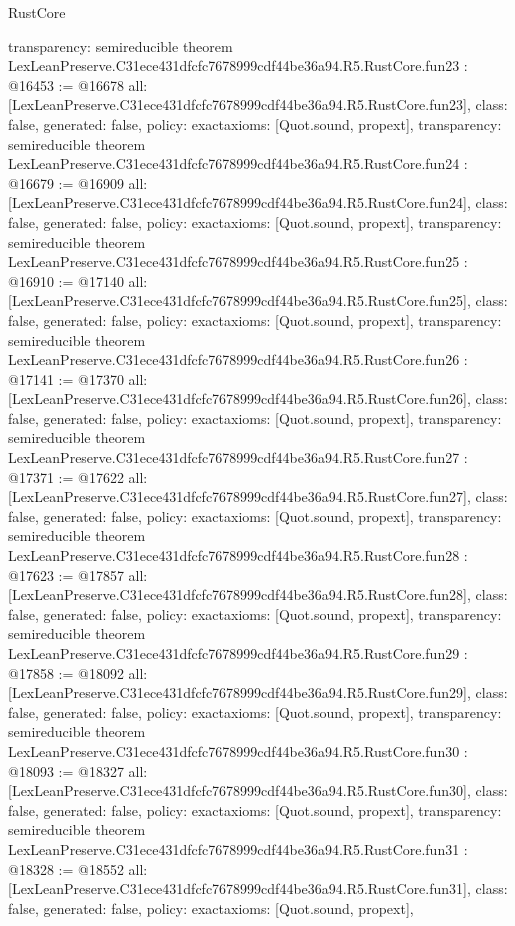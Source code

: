 \begin{lexlean}{RustCore}
\begin{coremodule}
{  transparency: semireducible
}
theorem LexLeanPreserve.C31ece431dfcfc7678999cdf44be36a94.R5.RustCore.fun23 : @16453 := @16678 {
  all: [LexLeanPreserve.C31ece431dfcfc7678999cdf44be36a94.R5.RustCore.fun23],
  class: false,
  generated: false,
  policy: exact{axioms: [Quot.sound, propext]},
  transparency: semireducible
}
theorem LexLeanPreserve.C31ece431dfcfc7678999cdf44be36a94.R5.RustCore.fun24 : @16679 := @16909 {
  all: [LexLeanPreserve.C31ece431dfcfc7678999cdf44be36a94.R5.RustCore.fun24],
  class: false,
  generated: false,
  policy: exact{axioms: [Quot.sound, propext]},
  transparency: semireducible
}
theorem LexLeanPreserve.C31ece431dfcfc7678999cdf44be36a94.R5.RustCore.fun25 : @16910 := @17140 {
  all: [LexLeanPreserve.C31ece431dfcfc7678999cdf44be36a94.R5.RustCore.fun25],
  class: false,
  generated: false,
  policy: exact{axioms: [Quot.sound, propext]},
  transparency: semireducible
}
theorem LexLeanPreserve.C31ece431dfcfc7678999cdf44be36a94.R5.RustCore.fun26 : @17141 := @17370 {
  all: [LexLeanPreserve.C31ece431dfcfc7678999cdf44be36a94.R5.RustCore.fun26],
  class: false,
  generated: false,
  policy: exact{axioms: [Quot.sound, propext]},
  transparency: semireducible
}
theorem LexLeanPreserve.C31ece431dfcfc7678999cdf44be36a94.R5.RustCore.fun27 : @17371 := @17622 {
  all: [LexLeanPreserve.C31ece431dfcfc7678999cdf44be36a94.R5.RustCore.fun27],
  class: false,
  generated: false,
  policy: exact{axioms: [Quot.sound, propext]},
  transparency: semireducible
}
theorem LexLeanPreserve.C31ece431dfcfc7678999cdf44be36a94.R5.RustCore.fun28 : @17623 := @17857 {
  all: [LexLeanPreserve.C31ece431dfcfc7678999cdf44be36a94.R5.RustCore.fun28],
  class: false,
  generated: false,
  policy: exact{axioms: [Quot.sound, propext]},
  transparency: semireducible
}
theorem LexLeanPreserve.C31ece431dfcfc7678999cdf44be36a94.R5.RustCore.fun29 : @17858 := @18092 {
  all: [LexLeanPreserve.C31ece431dfcfc7678999cdf44be36a94.R5.RustCore.fun29],
  class: false,
  generated: false,
  policy: exact{axioms: [Quot.sound, propext]},
  transparency: semireducible
}
theorem LexLeanPreserve.C31ece431dfcfc7678999cdf44be36a94.R5.RustCore.fun30 : @18093 := @18327 {
  all: [LexLeanPreserve.C31ece431dfcfc7678999cdf44be36a94.R5.RustCore.fun30],
  class: false,
  generated: false,
  policy: exact{axioms: [Quot.sound, propext]},
  transparency: semireducible
}
theorem LexLeanPreserve.C31ece431dfcfc7678999cdf44be36a94.R5.RustCore.fun31 : @18328 := @18552 {
  all: [LexLeanPreserve.C31ece431dfcfc7678999cdf44be36a94.R5.RustCore.fun31],
  class: false,
  generated: false,
  policy: exact{axioms: [Quot.sound, propext]},
}
\end{coremodule}
\end{lexlean}
